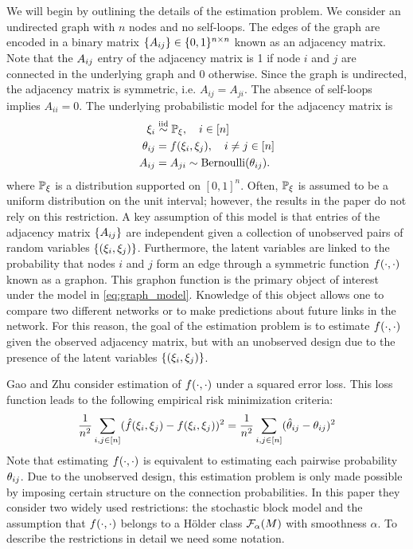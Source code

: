 \documentclass[11pt]{article}
\begin{document}
We will begin by outlining the details of the estimation problem. We consider an undirected graph with $n$ nodes and no self-loops. The edges of the graph are encoded in a binary matrix $\{A_{ij}\} \in \{0, 1\}^{n \times n}$ known as an adjacency matrix. Note that the $A_{ij}$ entry of the adjacency matrix is 1 if node $i$ and $j$ are connected in the underlying graph and 0 otherwise. Since the graph is undirected, the adjacency matrix is symmetric, i.e. $A_{ij} = A_{ji}$. The absence of self-loops implies $A_{ii} = 0$. The underlying probabilistic model for the adjacency matrix is
\begin{equation}\label{eq:graph_model}
\begin{aligned}
\xi_i &\overset{\text{iid}}{\sim} \mathbb{P}_{\xi}, \quad i \in \lbrack n\rbrack \\
\theta_{ij} &= f(\xi_{i}, \xi_{j}), \quad i \neq j \in \lbrack n\rbrack \\
A_{ij} &= A_{ji} \sim \operatorname{Bernoulli}(\theta_{ij}).
\end{aligned}
\end{equation}
where $\mathbb{P}_{\xi}$ is a distribution supported on $[0, 1]^n$. Often, $\mathbb{P}_{\xi}$ is assumed to be a uniform distribution on the unit interval; however, the results in the paper do not rely on this restriction. A key assumption of this model is that entries of the adjacency matrix $\{A_{ij}\}$ are independent given a collection of unobserved pairs of random variables $\{(\xi_i, \xi_j)\}$. Furthermore, the latent variables are linked to the probability that nodes $i$ and $j$ form an edge through a symmetric function $f(\cdot, \cdot)$ known as a graphon. This graphon function is the primary object of interest under the model in \ref{eq:graph_model}. Knowledge of this object allows one to compare two different networks or to make predictions about future links in the network.
For this reason, the goal of the estimation problem is to estimate $f(\cdot, \cdot)$ given the observed adjacency matrix, but with an unobserved design due to the presence of the latent variables $\{(\xi_i, \xi_j)\}$.

Gao and Zhu consider estimation of $f(\cdot, \cdot)$ under a squared error loss. This loss function leads to the following empirical risk minimization criteria:
\begin{equation}\label{eq:loss_func}
\frac{1}{n^2}\sum_{i, j \in \lbrack n\rbrack}(\hat{f}(\xi_i, \xi_j) - f(\xi_i, \xi_j))^2 =
\frac{1}{n^2}\sum_{i, j \in \lbrack n\rbrack}(\hat{\theta}_{ij} - \theta_{ij})^2
\end{equation}
Note that estimating $f(\cdot, \cdot)$ is equivalent to estimating each pairwise probability $\theta_{ij}$. Due to the unobserved design, this estimation problem is only made possible by imposing certain structure on the connection probabilities. In this paper they consider two widely used restrictions: the stochastic block model and the assumption that $f(\cdot, \cdot)$ belongs to a H\"older class $\mathcal{F}_{\alpha}(M)$ with smoothness $\alpha$. To describe the restrictions in detail we need some notation.
\end{document}

